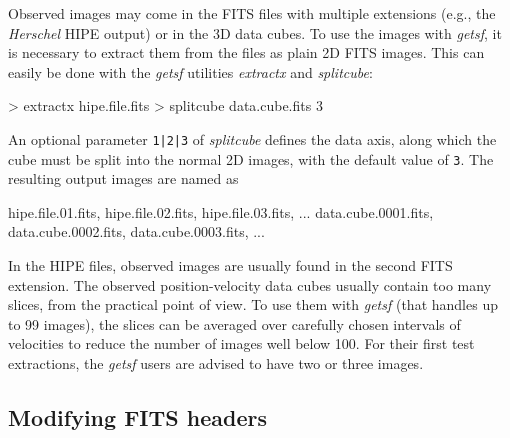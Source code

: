 \documentclass[a4paper,10pt]{article}
\begin{document}
Observed images may come in the FITS files with multiple extensions (e.g., the \emph{Herschel} HIPE output) or in the 3D data
cubes. To use the images with \textsl{getsf}, it is necessary to extract them from the files as plain 2D FITS images. This can
easily be done with the \textsl{getsf} utilities \textsl{extractx} and \textsl{splitcube}:
\begin{verbnobox}[\mbox{}\small]
> extractx hipe.file.fits
> splitcube data.cube.fits 3
\end{verbnobox}
An optional parameter \verb!1|2|3! of \textsl{splitcube} defines the data axis, along which the cube must be split into the normal
2D images, with the default value of \verb!3!. The resulting output images are named as
\begin{verbnobox}[\mbox{}\small]
hipe.file.01.fits, hipe.file.02.fits, hipe.file.03.fits, ...
data.cube.0001.fits, data.cube.0002.fits, data.cube.0003.fits, ...
\end{verbnobox}
In the HIPE files, observed images are usually found in the second FITS extension. The observed position-velocity data cubes
usually contain too many slices, from the practical point of view. To use them with \textsl{getsf} (that handles up to 99 images),
the slices can be averaged over carefully chosen intervals of velocities to reduce the number of images well below 100. For their
first test extractions, the \textsl{getsf} users are advised to have two or three images.


\subsection{Modifying FITS headers}
\label{headers}
\end{document}
